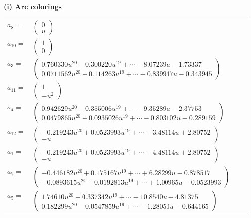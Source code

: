 \documentclass[1p]{elsarticle_modified}
\theoremstyle{definition}
\begin{document}
\flushleft \textbf{(i) Arc colorings}\\
\begin{tabular}{m{7pt} m{180pt} m{7pt} m{180pt} }
\flushright $a_{8}=$&$\begin{pmatrix}0\\u\end{pmatrix}$ \\
\flushright $a_{10}=$&$\begin{pmatrix}1\\0\end{pmatrix}$ \\
\flushright $a_{3}=$&$\begin{pmatrix}0.760330 u^{20}-0.300220 u^{19}+\cdots-8.07239 u-1.73337\\0.0711562 u^{20}-0.114263 u^{19}+\cdots-0.839947 u-0.343945\end{pmatrix}$ \\
\flushright $a_{11}=$&$\begin{pmatrix}1\\- u^2\end{pmatrix}$ \\
\flushright $a_{4}=$&$\begin{pmatrix}0.942629 u^{20}-0.355006 u^{19}+\cdots-9.35289 u-2.37753\\0.0479865 u^{20}-0.0935026 u^{19}+\cdots-0.803102 u-0.289159\end{pmatrix}$ \\
\flushright $a_{12}=$&$\begin{pmatrix}-0.219243 u^{20}+0.0523993 u^{19}+\cdots-3.48114 u+2.80752\\- u\end{pmatrix}$ \\
\flushright $a_{1}=$&$\begin{pmatrix}-0.219243 u^{20}+0.0523993 u^{19}+\cdots-4.48114 u+2.80752\\- u\end{pmatrix}$ \\
\flushright $a_{7}=$&$\begin{pmatrix}-0.446182 u^{20}+0.175167 u^{19}+\cdots+6.28299 u-0.878517\\-0.0893615 u^{20}-0.0192813 u^{19}+\cdots+1.00965 u-0.0523993\end{pmatrix}$ \\
\flushright $a_{5}=$&$\begin{pmatrix}1.74610 u^{20}-0.337342 u^{19}+\cdots-10.8540 u-4.81375\\0.182299 u^{20}-0.0547859 u^{19}+\cdots-1.28050 u-0.644165\end{pmatrix}$ \\

\end{tabular}
\end{document}
